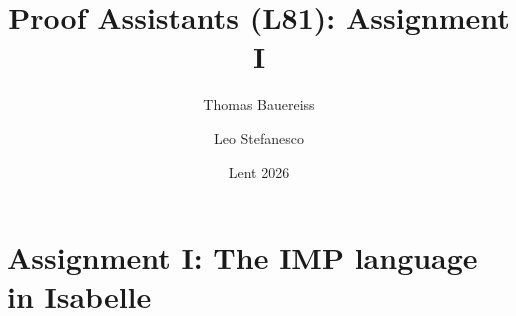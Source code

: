 \documentclass[11pt,a4paper]{article}
\renewcommand\_{\leavevmode \kern.06em\vbox{\hrule width.3em}}
\begin{document}
\title{Proof Assistants (L81): Assignment I}
\author{Thomas Bauereiss \and Leo Stefanesco}
\date{Lent 2026}
\maketitle





\newpage

\section*{Assignment I: The IMP language in Isabelle}



%
%
\end{document}
